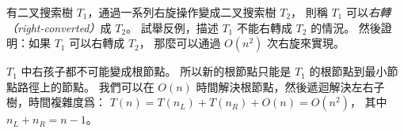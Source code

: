 \startEXERCISE
有二叉搜索樹 $T_1$，通過一系列右旋操作變成二叉搜索樹 $T_2$，
則稱 $T_1$ 可以\emph{右轉（right-converted）}成 $T_2$。
試舉反例，描述 $T_1$ 不能右轉成 $T_2$ 的情況。
然後證明：如果 $T_1$ 可以右轉成 $T_2$，
那麼可以通過 $O(n^2)$ 次右旋來實現。
\stopEXERCISE

\startANSWER
\startcombination[2*1]
{\externalfigure[output/e13_2_5-1]}{}
{\externalfigure[output/e13_2_5-2]}{}
\stopcombination

$T_1$ 中右孩子都不可能變成根節點。
所以新的根節點只能是 $T_1$ 的根節點到最小節點路徑上的節點。
我們可以在 $O(n)$ 時間解決根節點，然後遞迴解決左右子樹，時間複雜度爲：
$T(n)=T(n_L)+T(n_R)+O(n)=O(n^2)$，
其中 $n_L+n_R=n-1$。
\stopANSWER
